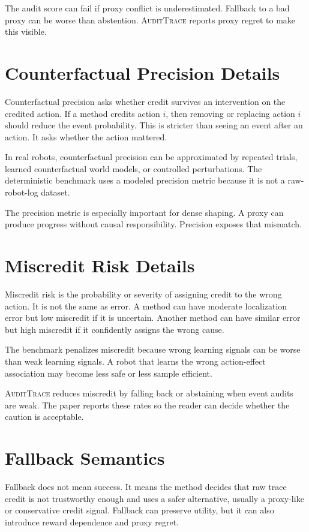 \documentclass{article}
\newcommand{\method}{\textsc{AuditTrace}\xspace}
\begin{document}
The audit score can fail if proxy conflict is underestimated. Fallback to a bad proxy can be worse than abstention. \method reports proxy regret to make this visible.

\section{Counterfactual Precision Details}

Counterfactual precision asks whether credit survives an intervention on the credited action. If a method credits action $i$, then removing or replacing action $i$ should reduce the event probability. This is stricter than seeing an event after an action. It asks whether the action mattered.

In real robots, counterfactual precision can be approximated by repeated trials, learned counterfactual world models, or controlled perturbations. The deterministic benchmark uses a modeled precision metric because it is not a raw-robot-log dataset.

The precision metric is especially important for dense shaping. A proxy can produce progress without causal responsibility. Precision exposes that mismatch.

\section{Miscredit Risk Details}

Miscredit risk is the probability or severity of assigning credit to the wrong action. It is not the same as error. A method can have moderate localization error but low miscredit if it is uncertain. Another method can have similar error but high miscredit if it confidently assigns the wrong cause.

The benchmark penalizes miscredit because wrong learning signals can be worse than weak learning signals. A robot that learns the wrong action-effect association may become less safe or less sample efficient.

\method reduces miscredit by falling back or abstaining when event audits are weak. The paper reports these rates so the reader can decide whether the caution is acceptable.

\section{Fallback Semantics}

Fallback does not mean success. It means the method decides that raw trace credit is not trustworthy enough and uses a safer alternative, usually a proxy-like or conservative credit signal. Fallback can preserve utility, but it can also introduce reward dependence and proxy regret.
\end{document}
